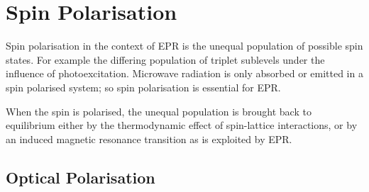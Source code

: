 \section{Spin Polarisation}\label{spin_polarisation}
\cite{2008}\cite{Weil2006}\cite{Goldfarb2018-he}\cite{Richert2017}
Spin polarisation in the context of EPR is the unequal population of possible spin states. 
For example the differing population of triplet sublevels under the influence of photoexcitation. 
Microwave radiation is only absorbed or emitted in a spin polarised system; so spin polarisation is essential for EPR. 

When the spin is polarised, the unequal population is brought back to equilibrium either by the thermodynamic effect of spin-lattice interactions, or by an induced magnetic resonance transition as is exploited by EPR.


\subsection{Optical Polarisation}
\cite{PhysRevB.105.165108}

